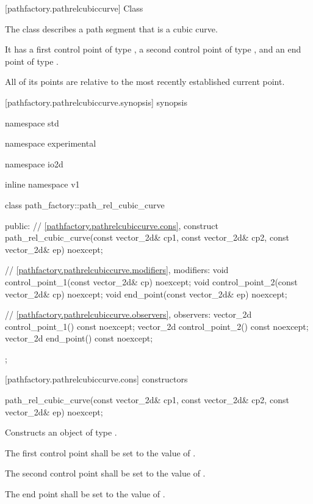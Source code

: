  [pathfactory.pathrelcubiccurve] {Class }

\pnum
{}
The class  describes a path segment that is a cubic \bezierlocal curve.

\pnum
It has a first control point of type , a second control point of type , and an end point of type .

\pnum
All of its points are relative to the most recently established current point.

 [pathfactory.pathrelcubiccurve.synopsis] { synopsis}

\begin{codeblock}
namespace std { namespace experimental { namespace io2d { inline namespace v1 {
  class path_factory::path_rel_cubic_curve {
  public:
    // \ref{pathfactory.pathrelcubiccurve.cons}, construct
    path_rel_cubic_curve(const vector_2d& cp1, const vector_2d& cp2,
      const vector_2d& ep) noexcept;

    // \ref{pathfactory.pathrelcubiccurve.modifiers}, modifiers:
    void control_point_1(const vector_2d& cp) noexcept;
    void control_point_2(const vector_2d& cp) noexcept;
    void end_point(const vector_2d& ep) noexcept;

    // \ref{pathfactory.pathrelcubiccurve.observers}, observers:
    vector_2d control_point_1() const noexcept;
    vector_2d control_point_2() const noexcept;
    vector_2d end_point() const noexcept;
  };
} } } }
\end{codeblock}

 [pathfactory.pathrelcubiccurve.cons] { constructors}
\begin{itemdecl}
    path_rel_cubic_curve(const vector_2d& cp1, const vector_2d& cp2,
      const vector_2d& ep) noexcept;
\end{itemdecl}
\begin{itemdescr}
	\pnum
	\effects
	Constructs an object of type .
	
	\pnum
	The first control point shall be set to the value of .
	
	\pnum
	The second control point shall be set to the value of .
	
	\pnum
	The end point shall be set to the value of .
\end{itemdescr}


